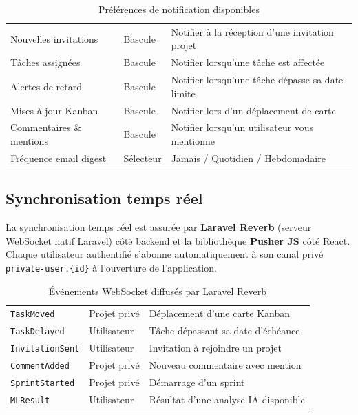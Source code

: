 \begin{table}[H]
  \centering
  \caption{Préférences de notification disponibles}
  \label{tab:preferences_notif}
  \begin{tabularx}{\textwidth}{L{5cm}L{3cm}X}
    \toprule
     &  &  \\
    \midrule
    Nouvelles invitations   & Bascule & Notifier à la réception d'une invitation projet \\
    Tâches assignées        & Bascule & Notifier lorsqu'une tâche est affectée \\
    Alertes de retard       & Bascule & Notifier lorsqu'une tâche dépasse sa date limite \\
    Mises à jour Kanban     & Bascule & Notifier lors d'un déplacement de carte \\
    Commentaires \& mentions & Bascule & Notifier lorsqu'un utilisateur vous mentionne \\
    Fréquence email digest  & Sélecteur & Jamais / Quotidien / Hebdomadaire \\
    \bottomrule
  \end{tabularx}
\end{table}

\subsection{Synchronisation temps réel}

La synchronisation temps réel est assurée par \textbf{Laravel Reverb} (serveur
WebSocket natif Laravel) côté backend et la bibliothèque \textbf{Pusher JS} côté
React. Chaque utilisateur authentifié s'abonne automatiquement à son canal privé
\texttt{private-user.\{id\}} à l'ouverture de l'application.

\begin{table}[H]
  \centering
  \caption{Événements WebSocket diffusés par Laravel Reverb}
  \label{tab:websocket_events}
  \begin{tabularx}{\textwidth}{L{5cm}L{3cm}X}
    \toprule
     &  &  \\
    \midrule
    \texttt{TaskMoved}      & Projet privé  & Déplacement d'une carte Kanban \\
    \texttt{TaskDelayed}    & Utilisateur   & Tâche dépassant sa date d'échéance \\
    \texttt{InvitationSent} & Utilisateur   & Invitation à rejoindre un projet \\
    \texttt{CommentAdded}   & Projet privé  & Nouveau commentaire avec mention \\
    \texttt{SprintStarted}  & Projet privé  & Démarrage d'un sprint \\
    \texttt{MLResult}       & Utilisateur   & Résultat d'une analyse IA disponible \\
    \bottomrule
  \end{tabularx}
\end{table}

